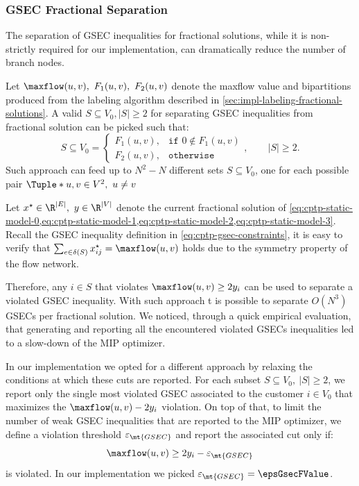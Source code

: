 \subsubsection{GSEC Fractional Separation}
\label{sec:impl-gsec-fractional-separation}

The separation of GSEC inequalities for fractional solutions,
while it is non-strictly required for our implementation,
can dramatically reduce the number of branch nodes.

Let $\maxflow(u, v),\ F_1(u, v),\ F_2(u, v)$ denote the maxflow value and bipartitions
produced from the labeling algorithm described in \cref{sec:impl-labeling-fractional-solutions}.
A valid $S \subseteq V_0, |S| \ge 2$ for separating GSEC inequalities from fractional solution can be picked such that:
\begin{equation}
	S \subseteq V_0 =
	\begin{cases}
		F_1(u, v), & \texttt{if } 0 \notin F_1(u, v) \\
		F_2(u, v), & \texttt{otherwise}
	\end{cases},
	\qquad
	|S| \ge 2.
\end{equation}
Such approach can feed up to
$N^2 - N$ different sets $S \subseteq V_0$,
one for each possible pair $\Tuple*{u, v} \in V^2,\ u \ne v$

Let $x^\star \in \R^{|E|},\ y \in \R^{|V|}$ denote the
current fractional solution of
\cref{eq:cptp-static-model-0,eq:cptp-static-model-1,eq:cptp-static-model-2,eq:cptp-static-model-3}.
Recall the GSEC inequality definition in \cref{eq:cptp-gsec-constraints},
it is easy to verify that $\sum_{e \in \delta(S)} x^\star_{ij} = \maxflow(u, v)$
holds due to the symmetry property of the flow network.

Therefore, any $i \in S$ that violates $\maxflow(u, v) \ge 2 y_i$
can be used to separate a violated GSEC inequality.
With such approach t is possible to separate $O(N^3)$ GSECs per fractional solution.
We noticed, through a quick empirical evaluation, that
generating and reporting all the encountered violated GSECs inequalities
led to a slow-down of the MIP optimizer.

\medskip
In our implementation we opted for a different approach by relaxing the conditions at which these cuts are reported.
For each subset $S \subseteq V_0,\ |S| \ge 2$, we report only the single most violated GSEC
associated to the customer $i \in V_0$ that maximizes the $\maxflow(u, v) - 2 y_i$ violation.
On top of that, to limit the number of weak GSEC inequalities that are reported to the MIP optimizer,
we define a violation threshold $\varepsilon_{\mt{GSEC}}$ and report the associated cut only if:
\begin{equation}
	\maxflow(u, v) \ge 2 y_i - \varepsilon_{\mt{GSEC}}
\end{equation}
is violated.
In our implementation we picked $\varepsilon_{\mt{GSEC}} = \epsGsecFValue$.

